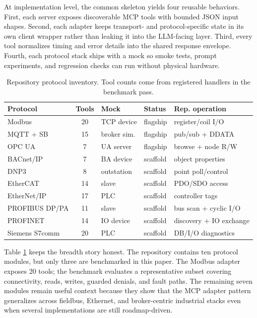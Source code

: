 \documentclass[conference]{IEEEtran}
\newcommand{\modbusToolCount}{20}
\newcommand{\mqttToolCount}{15}
\newcommand{\opcuaToolCount}{7}
\begin{document}
At implementation level, the common skeleton yields four reusable behaviors. First, each server exposes discoverable MCP tools with bounded JSON input shapes. Second, each adapter keeps transport- and protocol-specific state in its own client wrapper rather than leaking it into the LLM-facing layer. Third, every tool normalizes timing and error details into the shared response envelope. Fourth, each protocol stack ships with a mock so smoke tests, prompt experiments, and regression checks can run without physical hardware.

\begin{table}[t]
    \caption{Repository protocol inventory. Tool counts come from registered handlers in the benchmark pass.\protect\footnotemark}
    \label{tab:inventory}
    \centering
    \scriptsize
    \setlength{\tabcolsep}{2pt}
    \begin{tabularx}{\columnwidth}{@{}p{0.78in}cp{0.72in}p{0.6in}p{0.82in}@{}}
        \toprule
        Protocol & Tools & Mock & Status & Rep. operation \\
        \midrule
        Modbus & \modbusToolCount{} & TCP device & flagship & register/coil I/O \\
        MQTT + SB & \mqttToolCount{} & broker sim. & flagship & pub/sub + DDATA \\
        OPC UA & \opcuaToolCount{} & UA server & flagship & browse + node R/W \\
        \midrule
        BACnet/IP & 7 & BA device & scaffold & object properties \\
        DNP3 & 8 & outstation & scaffold & point poll/control \\
        EtherCAT & 14 & slave & scaffold & PDO/SDO access \\
        EtherNet/IP & 17 & PLC & scaffold & controller tags \\
        PROFIBUS DP/PA & 11 & slave & scaffold & bus scan + cyclic I/O \\
        PROFINET & 14 & IO device & scaffold & discovery + IO exchange \\
        Siemens S7comm & 20 & PLC & scaffold & DB/I/O diagnostics \\
        \bottomrule
    \end{tabularx}
\end{table}

Table \ref{tab:inventory} keeps the breadth story honest. The repository contains ten protocol modules, but only three are benchmarked in this paper. The Modbus adapter exposes \modbusToolCount{} tools; the benchmark evaluates a representative subset covering connectivity, reads, writes, guarded denials, and fault paths. The remaining seven modules remain useful context because they show that the MCP adapter pattern generalizes across fieldbus, Ethernet, and broker-centric industrial stacks even when several implementations are still roadmap-driven.
\end{document}
